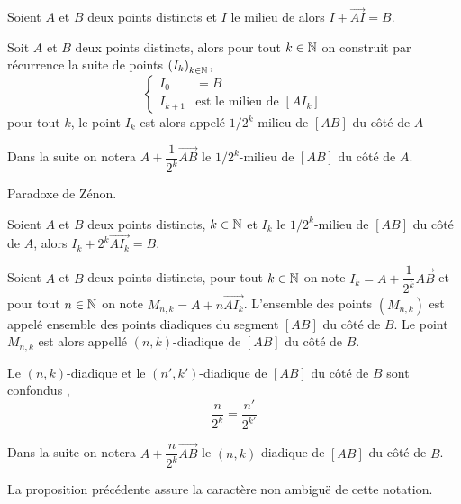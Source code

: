 \begin{prop}
   Soient $A$ et $B$ deux points distincts et $I$ le milieu de \addlb{$[AB]$\,;} alors $I+\overrightarrow{AI}=B$. 
\end{prop}
\begin{defi}[$1/2^k$-milieu]
    Soit $A$ et $B$ deux points distincts, alors pour tout $k\in \mathbb{N}$ on construit par récurrence la suite de points $\left(I_{k}\right)_{k \in \mathbb{N}}$,
    \begin{equation*}
        \left\{\begin{array}{rl}
             I_0 & = B\\
             I_{k+1} & \text{est le  milieu de $[AI_k]$}  
        \end{array}
        \right.
    \end{equation*}
    pour tout $k$, le point $I_k$ est alors appelé $1/2^k$-milieu de $[AB]$ du côté de $A$
\end{defi}
\begin{rema}
    Dans la suite on notera $A + \dfrac{1}{2^k}\overrightarrow{AB}$ le $1/2^k$-milieu de $[AB]$ du côté de $A$.
\end{rema}
\begin{rema}
    Paradoxe de Zénon.
\end{rema}
\begin{prop}
    Soient $A$ et $B$ deux points distincts, $k\in\mathbb{N}$ et $I_k$ le $1/2^k$-milieu de $[AB]$ du côté de $A$, alors $I_k+2^k \overrightarrow{AI_k}=B$.
\end{prop}
\begin{defi}
    Soient $A$ et $B$ deux points distincts, pour tout $k\in \mathbb{N}$ on note $I_k=A + \dfrac{1}{2^k}\overrightarrow{AB}$ et pour tout $n\in \mathbb{N}$ on note $M_{n,k} = A + n \overrightarrow{AI_k}$. L'ensemble des points $\left(M_{n,k}\right)$ est appelé ensemble des points diadiques du segment $[AB]$ du côté de $B$. Le point $M_{n,k}$ est alors appellé $(n,k)$-diadique de $[AB]$ du côté de $B$.
\end{defi}
\begin{prop}\label{prop-diadiqueconfondu}
    Le $(n,k)$-diadique et le $(n',k')$-diadique de $[AB]$ du côté de $B$ sont confondus \ssi,
    \begin{equation*}
        \dfrac{n}{2^k}=\dfrac{n'}{2^{k'}}
    \end{equation*}
\end{prop}
\begin{rema}
    Dans la suite on notera $A + \dfrac{n}{2^k}\overrightarrow{AB}$ le $(n,k)$-diadique de $[AB]$ du côté de $B$.

    La proposition précédente assure la caractère non ambiguë de cette notation.
\end{rema}
